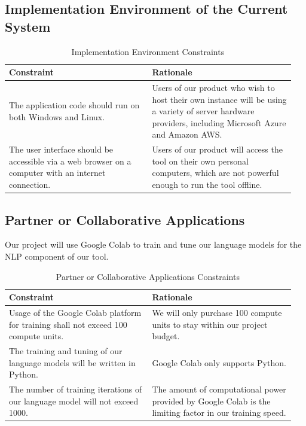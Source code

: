 \documentclass[12pt]{article}
\begin{document}
\subsection{Implementation Environment of the Current System}
\begin{table}[h!]
    \centering
    \begin{tabular}{| p{0.475\linewidth} | p{0.475\linewidth} |}
    \hline
    \textbf{Constraint}   & \textbf{Rationale} \\
    \hline
    The application code should run on both Windows and Linux. &
    Users of our product who wish to host their own instance will be using a variety of server hardware providers, including Microsoft Azure and Amazon AWS. \\
    \hline
    The user interface should be accessible via a web browser on a computer with an internet connection. &
    Users of our product will access the tool on their own personal computers, which are not powerful enough to run the tool offline. \\
    \hline
    \end{tabular}
    \caption{ Implementation Environment Constraints}
\end{table}


\newpage
\subsection{Partner or Collaborative Applications}
Our project will use Google Colab to train and tune our language models for the NLP component of our tool.
\begin{table}[h!]
    \centering
    \begin{tabular}{| p{0.475\linewidth} | p{0.475\linewidth} |}
    \hline
    \textbf{Constraint}   & \textbf{Rationale} \\
    \hline
    Usage of the Google Colab platform for training shall not exceed 100 compute units. &
    We will only purchase 100 compute units to stay within our project budget. \\
    \hline
    The training and tuning of our language models will be written in Python. &
    Google Colab only supports Python. \\
    \hline
    The number of training iterations of our language model will not exceed 1000. &
    The amount of computational power provided by Google Colab is the limiting factor in our training speed. \\
    \hline
    \end{tabular}
    \caption{ Partner or Collaborative Applications Constraints}
\end{table}
\end{document}
